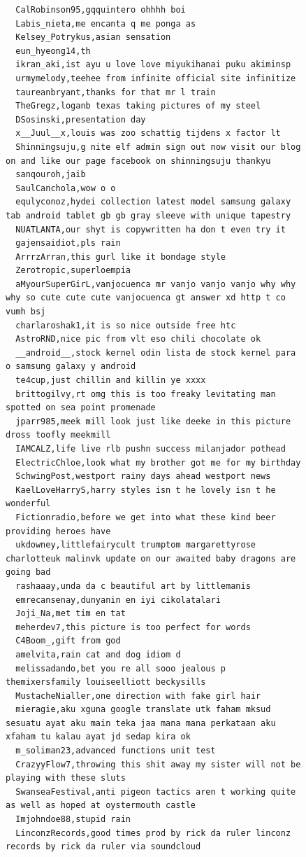 \begin{figure}[htpb]
\begin{verbatim}
  CalRobinson95,gqquintero ohhhh boi
  Labis_nieta,me encanta q me ponga as
  Kelsey_Potrykus,asian sensation
  eun_hyeong14,th
  ikran_aki,ist ayu u love love miyukihanai puku akiminsp
  urmymelody,teehee from infinite official site infinitize
  taureanbryant,thanks for that mr l train
  TheGregz,loganb texas taking pictures of my steel
  DSosinski,presentation day
  x__Juul__x,louis was zoo schattig tijdens x factor lt
  Shinningsuju,g nite elf admin sign out now visit our blog on and like our page facebook on shinningsuju thankyu
  sanqouroh,jaib
  SaulCanchola,wow o o
  equlyconoz,hydei collection latest model samsung galaxy tab android tablet gb gb gray sleeve with unique tapestry
  NUATLANTA,our shyt is copywritten ha don t even try it
  gajensaidiot,pls rain
  ArrrzArran,this gurl like it bondage style
  Zerotropic,superloempia
  aMyourSuperGirL,vanjocuenca mr vanjo vanjo vanjo why why why so cute cute cute vanjocuenca gt answer xd http t co vumh bsj
  charlaroshak1,it is so nice outside free htc
  AstroRND,nice pic from vlt eso chili chocolate ok
  __android__,stock kernel odin lista de stock kernel para o samsung galaxy y android
  te4cup,just chillin and killin ye xxxx
  brittogilvy,rt omg this is too freaky levitating man spotted on sea point promenade
  jparr985,meek mill look just like deeke in this picture dross toofly meekmill
  IAMCALZ,life live rlb pushn success milanjador pothead
  ElectricChloe,look what my brother got me for my birthday
  SchwingPost,westport rainy days ahead westport news
  KaelLoveHarryS,harry styles isn t he lovely isn t he wonderful
  Fictionradio,before we get into what these kind beer providing heroes have
  ukdowney,littlefairycult trumptom margarettyrose charlotteuk malinvk update on our awaited baby dragons are going bad
  rashaaay,unda da c beautiful art by littlemanis
  emrecansenay,dunyanin en iyi cikolatalari
  Joji_Na,met tim en tat
  meherdev7,this picture is too perfect for words
  C4Boom_,gift from god
  amelvita,rain cat and dog idiom d
  melissadando,bet you re all sooo jealous p themixersfamily louiseelliott beckysills
  MustacheNialler,one direction with fake girl hair
  mieragie,aku xguna google translate utk faham mksud sesuatu ayat aku main teka jaa mana mana perkataan aku xfaham tu kalau ayat jd sedap kira ok
  m_soliman23,advanced functions unit test
  CrazyyFlow7,throwing this shit away my sister will not be playing with these sluts
  SwanseaFestival,anti pigeon tactics aren t working quite as well as hoped at oystermouth castle
  Imjohndoe88,stupid rain
  LinconzRecords,good times prod by rick da ruler linconz records by rick da ruler via soundcloud

\end{verbatim}
\end{figure}
